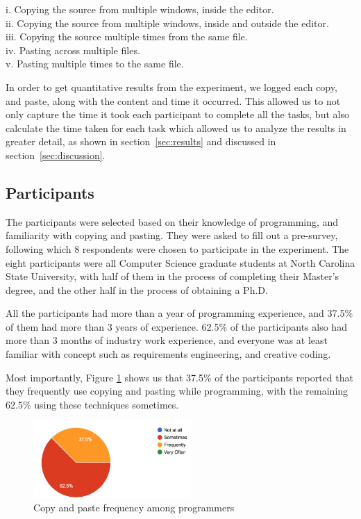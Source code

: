 \documentclass{acm_proc_article-sp}
\begin{document}
i. Copying the source from multiple windows, inside the editor.\\
ii. Copying the source from multiple windows, inside and outside the editor.\\
iii. Copying the source multiple times from the same file.\\
iv. Pasting across multiple files.\\
v. Pasting multiple times to the same file.

In order to get quantitative results from the experiment, we logged each copy, and paste, along with the content and time it occurred. This allowed us to not only capture the time it took each participant to complete all the tasks, but also calculate the time taken for each task which allowed us to analyze the results in greater detail, as shown in section~\ref{sec:results} and discussed in section~\ref{sec:discussion}.

\subsection{Participants}\label{sec:participants}

The participants were selected based on their knowledge of programming, and familiarity with copying and pasting. They were asked to fill out a pre-survey, following which 8 respondents were chosen to participate in the experiment. The eight participants were all Computer Science graduate students at North Carolina State University, with half of them in the process of completing their Master's degree, and the other half in the process of obtaining a Ph.D. 

All the participants had more than a year of programming experience, and 37.5\% of them had more than 3 years of experience. 62.5\% of the participants also had more than 3 months of industry work experience, and everyone was at least familiar with concept such as requirements engineering, and creative coding. 

Most importantly, Figure \ref{fig:Frequency} shows us that 37.5\% of the participants reported that they frequently use copying and pasting while programming, with the remaining 62.5\% using these techniques sometimes.

\begin{figure}[h]
\centering
\includegraphics[width=6cm]{frequency}
\caption{Copy and paste frequency among programmers}
\label{fig:Frequency}
\end{figure} 
\end{document}
